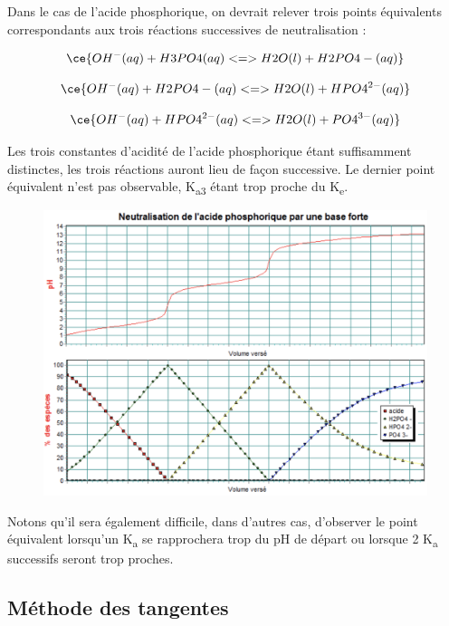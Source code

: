 \documentclass[
  11pt,
  a4paper,
  openany]{book}
\begin{document}
Dans le cas de l'acide phosphorique, on devrait relever trois points équivalents correspondants aux trois réactions successives de neutralisation :

\[
\ce{OH^{-}(aq) + H3PO4(aq) <=> H2O(l) + H2PO4-(aq)}
\]

\[
\ce{OH^{-}(aq) + H2PO4-(aq) <=> H2O(l) + HPO4^{2-}(aq)}
\]

\[
\ce{OH^{-}(aq) + HPO4^{2-}(aq) <=> H2O(l) + PO4^{3-}(aq)}
\]

Les trois constantes d'acidité de l'acide phosphorique étant suffisamment distinctes, les trois réactions auront lieu de façon successive. Le dernier point équivalent n'est pas observable, K\textsubscript{a3} étant trop proche du K\textsubscript{e}.

\begin{figure}

{\centering \includegraphics[width=1\linewidth]{images/acides-bases-6d} 

}

\end{figure}

Notons qu'il sera également difficile, dans d'autres cas, d'observer le point équivalent lorsqu'un K\textsubscript{a} se rapprochera trop du pH de départ ou lorsque 2 K\textsubscript{a} successifs seront trop proches.

\hypertarget{muxe9thode-des-tangentes}{%
\subsection{Méthode des tangentes}\label{muxe9thode-des-tangentes}}
\end{document}
